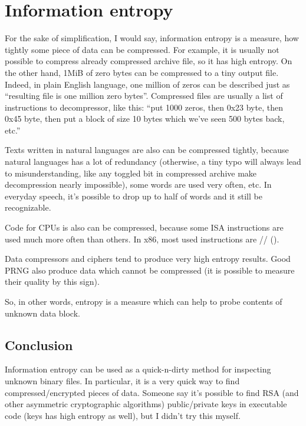 \section{Information entropy}
\label{entropy}

For the sake of simplification, I would say, information entropy is a measure,
how tightly some piece of data can be compressed.
For example, it is usually not possible to compress already compressed archive file, so it has high entropy.
On the other hand, 1MiB of zero bytes can be compressed to a tiny output file.
Indeed, in plain English language, one million of zeros can be described just as
``resulting file is one million zero bytes''.
Compressed files are usually a list of instructions to decompressor, like this:
``put 1000 zeros, then 0x23 byte, then 0x45 byte, then put a block of size 10 bytes which we've seen 500 bytes back, etc.''

Texts written in natural languages are also can be compressed tightly, 
because natural languages has a lot of redundancy
(otherwise, a tiny typo will always lead to misunderstanding, 
like any toggled bit in compressed archive make decompression nearly impossible), 
some words are used very often, etc.
In everyday speech, it's possible to drop up to half of words and it still be recognizable.

Code for CPUs is also can be compressed, because some \ac{ISA} instructions are used much more often than others.
In x86, most used instructions are // ().

Data compressors and ciphers tend to produce very high entropy results.
Good \ac{PRNG} also produce data which cannot be compressed 
(it is possible to measure their quality by this sign).

So, in other words, entropy is a measure which can help to probe contents of unknown data block.



\subsection{Conclusion}

Information entropy can be used as a quick-n-dirty method for inspecting unknown binary files.
In particular, it is a very quick way to find compressed/encrypted pieces of data.
Someone say it's possible to find \ac{RSA} (and other asymmetric cryptographic algorithms) public/private keys 
in executable code (keys has high entropy as well), but I didn't try this myself.

